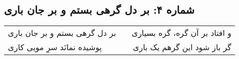 \begin{center}
\section*{شماره ۴: بر دل گرهی بستم و بر جان باری}
\label{sec:004}
\begin{longtable}{l p{0.5cm} r}
بر دل گرهی بستم و بر جان باری
&&
و افتاد بر آن گره، گره بسیاری
\\
پوشیده نمانَد سرِ مویی کاری
&&
گر باز شود این گرهم یک باری
\\
\end{longtable}
\end{center}
